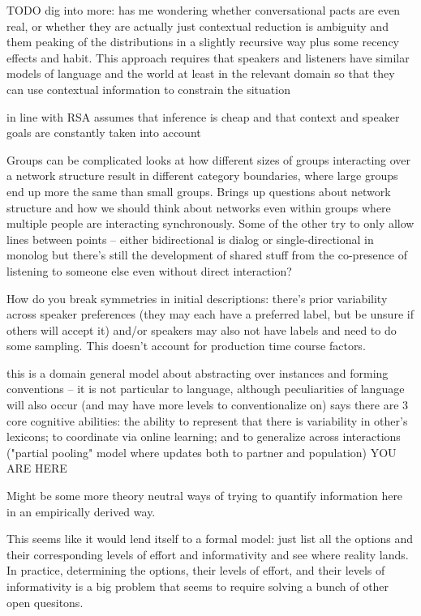 \documentclass[]{article}
\begin{document}
	TODO dig into more: \cite{piantadosi2012} has me wondering whether conversational pacts are even real, or whether they are actually just contextual reduction is ambiguity and them peaking of the distributions in a slightly recursive way plus some recency effects and habit. This approach requires that speakers and listeners have similar models of language and the world at least in the relevant domain so that they can use contextual information to constrain the situation 
	
	\cite{piantadosi2012} in line with RSA assumes that inference is cheap and that context and speaker goals are constantly taken into account 
	
	Groups can be complicated \cite{guilbeault2021} looks at how different sizes of groups interacting over a network structure result in different category boundaries, where large groups end up more the same than small groups. Brings up questions about network structure and how we should think about networks even within groups where multiple people are interacting synchronously. Some of the other try to only allow lines between points -- either bidirectional is dialog or single-directional in monolog but there's still the development of shared stuff from the co-presence of listening to someone else even without direct interaction? 
	
	
	\cite{hawkins2020b} How do you break symmetries in initial descriptions: there's prior variability across speaker preferences (they may each have a preferred label, but be unsure if others will accept it) and/or speakers may also not have labels and need to do some sampling. This doesn't account for production time course factors. 
	
	this is a domain general model about abstracting over instances and forming conventions -- it is not particular to language, although peculiarities of language will also occur (and may have more levels to conventionalize on) 
	\cite{hawkins2021} says there are 3 core cognitive abilities: the ability to represent that there is variability in other's lexicons; to coordinate via online learning; and to generalize across interactions ("partial pooling" model where updates both to partner and population) 
YOU ARE HERE


Might be some more theory neutral ways of trying to quantify information here in an empirically derived way. 



This seems like it would lend itself to a formal model: just list all the options and their corresponding levels of effort and informativity and see where reality lands. In practice, determining the options, their levels of effort, and their levels of informativity is a big problem that seems to require solving a bunch of other open quesitons. 
\end{document}
